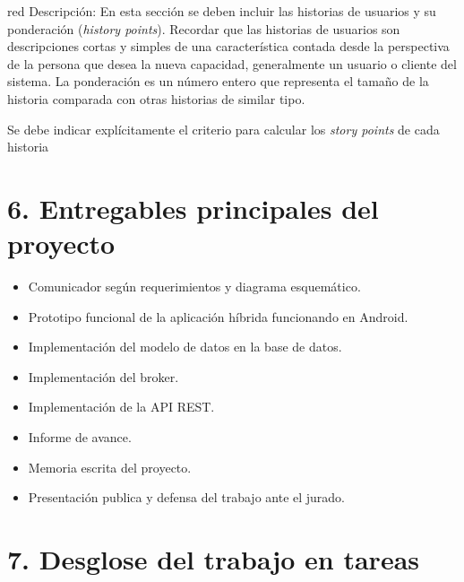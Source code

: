 \documentclass[
11pt, %
codirector, %
]{charter}
\begin{document}
\begin{consigna}{red}
Descripción: En esta sección se deben incluir las historias de usuarios y su ponderación (\textit{history points}). Recordar que las historias de usuarios son descripciones cortas y simples de una característica contada desde la perspectiva de la persona que desea la nueva capacidad, generalmente un usuario o cliente del sistema. La ponderación es un número entero que representa el tamaño de la historia comparada con otras historias de similar tipo.

Se debe indicar explícitamente el criterio para calcular los \textit{story points} de cada historia
\end{consigna}

\section{6. Entregables principales del proyecto}
\label{sec:entregables}


\begin{itemize}
	\item Comunicador según requerimientos y diagrama esquemático.
	\item Prototipo funcional de la aplicación híbrida funcionando en Android.
	\item Implementación del modelo de datos en la base de datos.
	\item Implementación del broker.
	\item Implementación de la API REST.
	\item Informe de avance.
	\item Memoria escrita del proyecto.
	\item Presentación publica y defensa del trabajo ante el jurado.
\end{itemize}


\section{7. Desglose del trabajo en tareas}
\label{sec:wbs}

\end{document}
